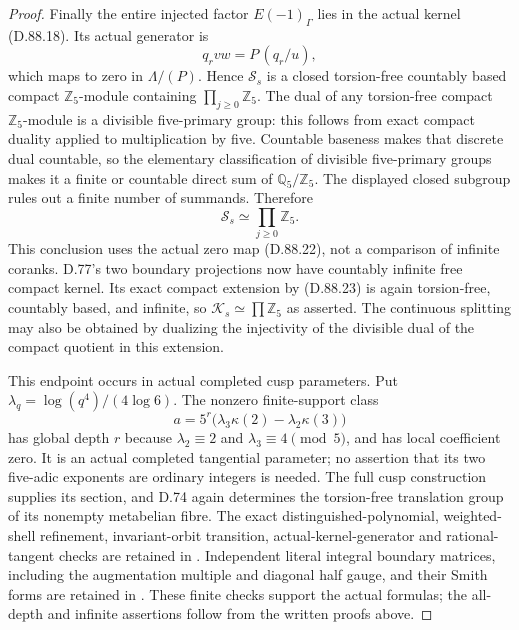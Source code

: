 \begin{proof}
Finally the entire injected factor \(E(-1)_\Gamma\) lies in
the actual kernel (D.88.18). Its actual generator is
\[
                     q_rvw=P\,(q_r/u),                 \tag{D.88.22}
\]
which maps to zero in \(\Lambda/(P)\). Hence
\(\mathcal S_s\) is a closed torsion-free countably based
compact \(\mathbb Z_5\)-module containing
\(\prod_{j\ge0}\mathbb Z_5\). The dual of any torsion-free
compact \(\mathbb Z_5\)-module is a divisible five-primary
group: this follows from exact compact duality applied to
multiplication by five. Countable baseness makes that discrete
dual countable, so the elementary classification of divisible
five-primary groups makes it a finite or countable direct sum
of \(\mathbb Q_5/\mathbb Z_5\). The displayed closed subgroup
rules out a finite number of summands. Therefore
\[
                    \mathcal S_s\simeq\prod_{j\ge0}\mathbb Z_5.
                                                               \tag{D.88.23}
\]
This conclusion uses the actual zero map (D.88.22), not a
comparison of infinite coranks. D.77's two boundary projections
now have countably infinite free compact kernel. Its exact
compact extension by (D.88.23) is again torsion-free, countably
based, and infinite, so \(\mathcal K_s\simeq\prod\mathbb Z_5\)
as asserted. The continuous splitting may also be obtained by
dualizing the injectivity of the divisible dual of the compact
quotient in this extension.

This endpoint occurs in actual completed cusp parameters. Put
\(\lambda_q=\log(q^4)/(4\log6)\). The nonzero finite-support
class
\[
          a=5^r\bigl(\lambda_3\kappa(2)
                         -\lambda_2\kappa(3)\bigr)    \tag{D.88.24}
\]
has global depth \(r\) because \(\lambda_2\equiv2\) and
\(\lambda_3\equiv4\pmod5\), and has local coefficient zero.
It is an actual completed tangential parameter; no assertion
that its two five-adic exponents are ordinary integers is needed.
The full cusp construction supplies its section, and D.74
again determines the torsion-free translation group of its
nonempty metabelian fibre.
The exact distinguished-polynomial, weighted-shell refinement,
invariant-orbit transition, actual-kernel-generator and rational-tangent
checks are retained in
. Independent
literal integral boundary matrices, including the augmentation
multiple and diagonal half gauge, and their Smith forms are retained in
. These finite checks
support the actual formulas; the all-depth and infinite assertions
follow from the written proofs above.
\end{proof}
